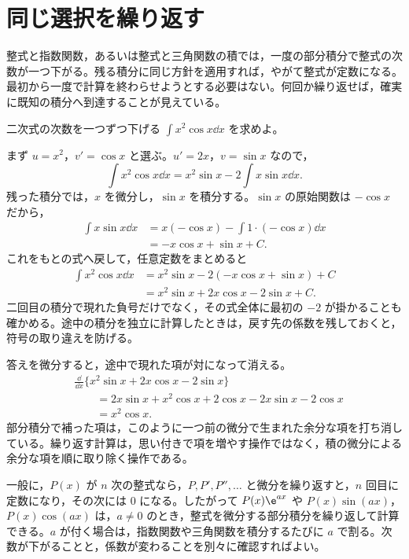 \section{同じ選択を繰り返す}\label{節:部分積分の反復}

整式と指数関数，あるいは整式と三角関数の積では，一度の部分積分で整式の次数が一つ下がる。残る積分に同じ方針を適用すれば，やがて整式が定数になる。最初から一度で計算を終わらせようとする必要はない。何回か繰り返せば，確実に既知の積分へ到達することが見えている。

\begin{example}{二次式の次数を一つずつ下げる}
$\int x^2\cos x\dd x$ を求めよ。
\end{example}

まず $u=x^2$，$v'=\cos x$ と選ぶ。$u'=2x$，$v=\sin x$ なので，
\[
 \int x^2\cos x\dd x
 =x^2\sin x-2\int x\sin x\dd x.
\]
残った積分では，$x$ を微分し，$\sin x$ を積分する。$\sin x$ の原始関数は $-\cos x$ だから，
\[
\begin{aligned}
 \int x\sin x\dd x
 &=x(-\cos x)-\int1\cdot(-\cos x)\dd x\\
 &=-x\cos x+\sin x+C.
\end{aligned}
\]
これをもとの式へ戻して，任意定数をまとめると
\[
\begin{aligned}
 \int x^2\cos x\dd x
 &=x^2\sin x-2(-x\cos x+\sin x)+C\\
 &=x^2\sin x+2x\cos x-2\sin x+C.
\end{aligned}
\]
二回目の積分で現れた負号だけでなく，その式全体に最初の $-2$ が掛かることも確かめる。途中の積分を独立に計算したときは，戻す先の係数を残しておくと，符号の取り違えを防げる。

答えを微分すると，途中で現れた項が対になって消える。
\[
\begin{aligned}
 &\frac{\dd}{\dd x}
  \{x^2\sin x+2x\cos x-2\sin x\}\\
 &\qquad=2x\sin x+x^2\cos x
       +2\cos x-2x\sin x-2\cos x\\
 &\qquad=x^2\cos x.
\end{aligned}
\]
部分積分で補った項は，このように一つ前の微分で生まれた余分な項を打ち消している。繰り返す計算は，思い付きで項を増やす操作ではなく，積の微分による余分な項を順に取り除く操作である。

一般に，$P(x)$ が $n$ 次の整式なら，$P,P',P'',\ldots$ と微分を繰り返すと，$n$ 回目に定数になり，その次には $0$ になる。したがって $P(x)\e^{ax}$ や $P(x)\sin(ax)$，$P(x)\cos(ax)$ は，$a\ne0$ のとき，整式を微分する部分積分を繰り返して計算できる。$a$ が付く場合は，指数関数や三角関数を積分するたびに $a$ で割る。次数が下がることと，係数が変わることを別々に確認すればよい。

